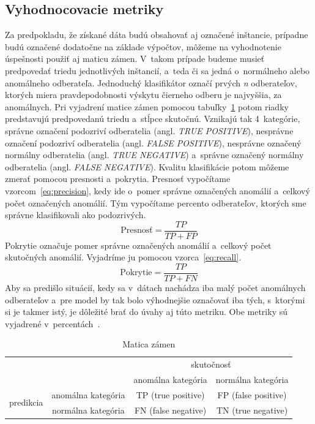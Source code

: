 \documentclass[a4paper,twoside,slovak,12pt,appendix]{article}
\begin{document}
\subsection{Vyhodnocovacie metriky}
Za predpokladu, že získané dáta budú obsahovať aj označené inštancie, prípadne
budú označené dodatočne na základe výpočtov, môžeme na vyhodnotenie úspešnosti
použiť aj maticu zámen. V~takom prípade budeme musieť predpovedať triedu
jednotlivých inštancií, a~teda či sa jedná o~normálneho alebo anomálneho
odberateľa. Jednoduchý klasifikátor označí prvých \textit{n} odberateľov,
ktorých miera pravdepodobnosti výskytu čierneho odberu je najvyššia, za
anomálnych. Pri vyjadrení matice zámen pomocou
tabuľky~\ref{tab:confusion-matrix} potom riadky predstavujú predpovedanú triedu
a~stĺpce skutočnú. Vznikajú tak 4~kategórie, správne označení podozriví 
odberatelia (angl. \textit{TRUE POSITIVE}), nesprávne označení podozriví 
odberatelia (angl. \textit{FALSE POSITIVE}), nesprávne označený normálny 
odberatelia (angl. \textit{TRUE NEGATIVE}) a~správne označený normálny 
odberatelia (angl. \textit{FALSE NEGATIVE}). Kvalitu klasifikácie potom môžeme 
zmerať pomocou presnosti a~pokrytia. Presnosť vypočítame 
vzorcom~\ref{eq:precision}, kedy ide o~pomer správne označených anomálií 
a~celkový počet označených anomálií. Tým vypočítame percento odberateľov, 
ktorých sme správne klasifikovali ako podozrivých.
\begin{equation}
	\label{eq:precision}
  \text{Presnosť} = \frac{TP}{TP + FP}
\end{equation}
Pokrytie označuje pomer správne označených anomálií a~celkový počet skutočných
anomálií. Vyjadríme ju pomocou vzorca~\ref{eq:recall}.
\begin{equation}
	\label{eq:recall}
  \text{Pokrytie} = \frac{TP}{TP + FN}
\end{equation}
Aby sa predišlo situácií, kedy sa v~dátach nachádza iba malý počet anomálnych
odberateľov a~pre model by tak bolo výhodnejšie označovať iba tých, s~ktorými si
je takmer istý, je dôležité brať do úvahy aj túto metriku. Obe metriky sú
vyjadrené v~percentách~\cite{Trevizan2015,Wei2006}.

\begin{table}[]
	\centering
	\caption{Matica zámen}
	\label{tab:confusion-matrix}
	\begin{tabular}{|c|c|c|c|}
		\hline
		\multicolumn{2}{|c|}{\multirow{2}{*}{}} 									 & \multicolumn{2}{c|}{skutočnosť} 							 \\ \cline{3-4}
		\multicolumn{2}{|c|}{}       									      			 &  anomálna kategória   &  normálna kategória   \\ \hline
		\multirow{2}{*}[1.2pt]{predikcia}   &  anomálna kategória  &  TP (true positive)   &  FP (false positive)  \\ \cline{2-4}
																				&  normálna kategória  &  FN (false negative)  &  TN (true negative)   \\ \hline
	\end{tabular}
\end{table}
\end{document}
